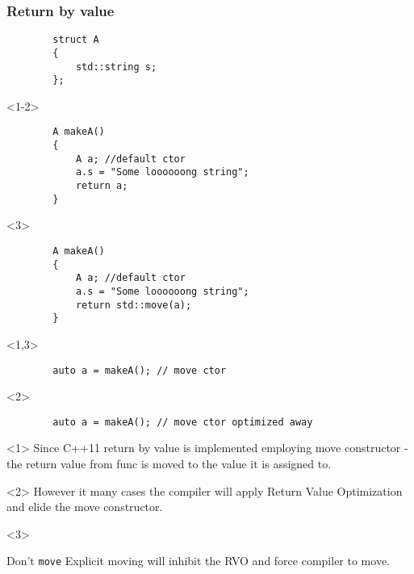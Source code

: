 \documentclass{beamer}
\begin{document}
\begin{frame}[fragile,t]
\frametitle{Return by value}
    \begin{lstlisting}
        struct A
        {
            std::string s;
        };
    \end{lstlisting}

    \begin{onlyenv}<1-2>
    \begin{lstlisting}
        A makeA()
        {
            A a; //default ctor
            a.s = "Some loooooong string";
            return a;
        }
    \end{lstlisting}
    \end{onlyenv}
    \begin{onlyenv}<3>
    \begin{lstlisting}
        A makeA()
        {
            A a; //default ctor
            a.s = "Some loooooong string";
            return std::move(a);
        }
    \end{lstlisting}
    \end{onlyenv}
    \hrulefill
    \begin{onlyenv}<1,3>
    \begin{lstlisting}
        auto a = makeA(); // move ctor
    \end{lstlisting}
    \end{onlyenv}
    \begin{onlyenv}<2>
    \begin{lstlisting}
        auto a = makeA(); // move ctor optimized away
    \end{lstlisting}
    \end{onlyenv}
    \hrulefill

    \begin{onlyenv}<1>
    Since C++11 return by value is implemented employing move constructor - the return value from func is moved to
    the value it is assigned to.
    \end{onlyenv}

    \begin{onlyenv}<2>
    However it many cases the compiler will apply Return Value Optimization and elide the move constructor.
    \end{onlyenv}
    \begin{onlyenv}<3>
    \begin{alertblock}{Don't \texttt{move}}
        Explicit moving will inhibit the RVO and force compiler to move.
    \end{alertblock}
    \end{onlyenv}

\end{frame}
\end{document}
